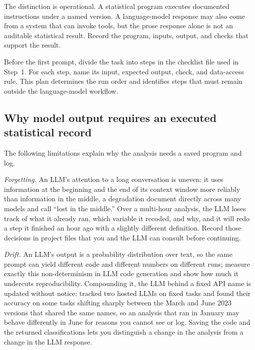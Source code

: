 \documentclass[
    a4paper,
    fontsize=10pt,
    twoside=true,
    numbers=noenddot,
]{kaobook}
\begin{document}
The distinction is operational. A statistical program executes documented instructions under a named version. A language-model response may also come from a system that can invoke tools, but the prose response alone is not an auditable statistical result. Record the program, inputs, output, and checks that support the result.

Before the first prompt, divide the task into steps in the checklist file used in Step~1. For each step, name its input, expected output, check, and data-access rule. This plan determines the run order and identifies steps that must remain outside the language-model workflow.

\subsection{Why model output requires an executed statistical record}\label{sec:llm-limits}
The following limitations explain why the analysis needs a saved program and log.

\emph{Forgetting.} An LLM's attention to a long conversation is uneven: it uses information at the beginning and the end of its context window more reliably than information in the middle, a degradation \textcite{liu2024lost} document directly across many models and call \enquote{lost in the middle.} Over a multi-hour analysis, the LLM loses track of what it already ran, which variable it recoded, and why, and it will redo a step it finished an hour ago with a slightly different definition. Record those decisions in project files that you and the LLM can consult before continuing.

\emph{Drift.} An LLM's output is a probability distribution over text, so the same prompt can yield different code and different numbers on different runs; \textcite{ouyang2025nondeterminism} measure exactly this non-determinism in LLM code generation and show how much it undercuts reproducibility. Compounding it, the LLM behind a fixed API name is updated without notice: \textcite{chen2023drift} tracked two hosted LLMs on fixed tasks and found their accuracy on some tasks shifting sharply between the March and June 2023 versions that shared the same names, so an analysis that ran in January may behave differently in June for reasons you cannot see or log. Saving the code and the returned classifications lets you distinguish a change in the analysis from a change in the LLM response.
\end{document}
